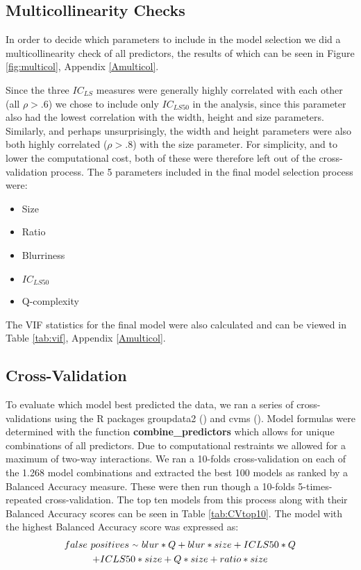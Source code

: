 \documentclass[12pt]{article}
\newcommand{\mytilde}{\raise.17ex\hbox{$\scriptstyle\mathtt{\sim}$}} %
\begin{document}
\subsection{Multicollinearity Checks}
In order to decide which parameters to include in the model selection we did a multicollinearity check of all predictors, the results of which can be seen in Figure \ref{fig:multicol}, Appendix \ref{Amulticol}.

Since the three $IC_{LS}$ measures were generally highly correlated with each other (all $\rho > .6$) we chose to include only $IC_{LS50}$ in the analysis, since this parameter also had the lowest correlation with the width, height and size parameters. 
Similarly, and perhaps unsurprisingly, the width and height parameters were also both highly correlated ($\rho > .8$) with the size parameter. For simplicity, and to lower the computational cost, both of these were therefore left out of the cross-validation process.
The 5 parameters included in the final model selection process were:
\begin{itemize}
	\item Size
	\item Ratio
	\item Blurriness
	\item $IC_{LS50}$
	\item Q-complexity
\end{itemize}

The VIF statistics for the final model were also calculated and can be viewed in Table \ref{tab:vif}, Appendix \ref{Amulticol}.

\subsection{Cross-Validation}
To evaluate which model best predicted the data, we ran a series of cross-validations using the R packages groupdata2 (\cite{olsenGroupdata22020}) and cvms (\cite{olsenCvms2020}).
Model formulas were determined with the function \textbf{combine\_predictors} which allows for unique combinations of all predictors. Due to computational restraints we allowed for a maximum of two-way interactions. We ran a 10-folds cross-validation on each of the 1.268 model combinations and extracted the best 100 models as ranked by a Balanced Accuracy measure. These were then run though a 10-folds 5-times-repeated cross-validation. The top ten models from this process along with their Balanced Accuracy scores can be seen in Table \ref{tab:CVtop10}. The model with the highest Balanced Accuracy score was expressed as:
\begin{multline*}
		 false \ positives \ \mytilde \ blur*Q + blur*size + ICLS50*Q\\
		  + ICLS50*size + Q*size + ratio*size
	\label{eq:bestmodel}
\end{multline*} 
\end{document}
